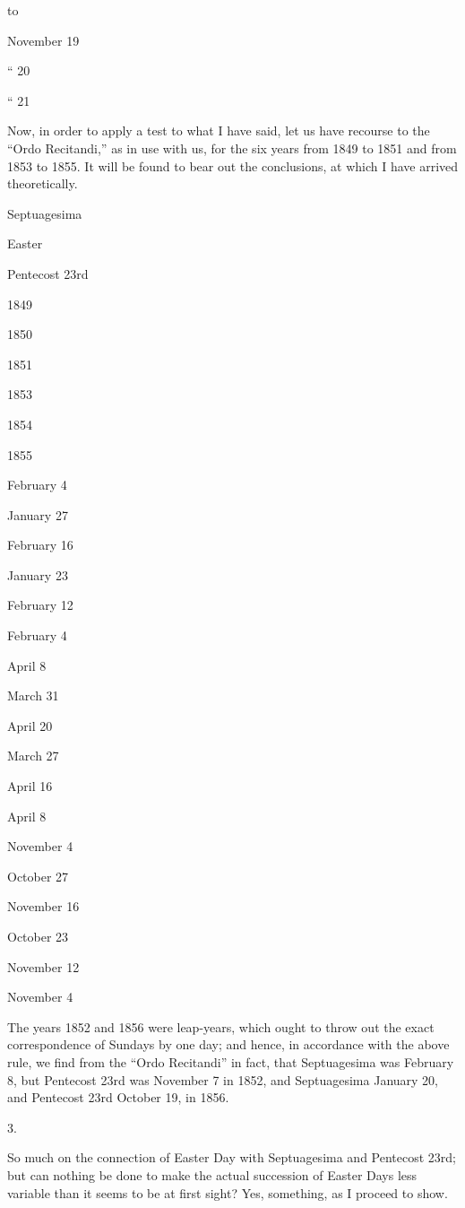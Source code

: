 to 

November 19

``
20

``
21

Now, in order to apply a
test to what I have said, let us have recourse to the ``Ordo
Recitandi,'' as in use with us, for the six years from 1849 to 1851 and from 1853 to
1855. It will be found to bear out the conclusions, at which I have
arrived theoretically.

Septuagesima

Easter

Pentecost
23rd

1849

1850

1851

1853

1854

1855

February 4

January 27

February 16

January 23

February 12

February 4

April 8

March 31

April 20

March 27

April 16

April 8

November 4

October
27

November 16

October
23

November 12

November 4

The years 1852 and 1856 were
leap-years, which ought to throw out the exact correspondence of
Sundays by one day; and hence, in accordance with the above rule, we
find from the ``Ordo Recitandi'' in fact, that Septuagesima was
February 8, but Pentecost 23rd was November 7 in 1852, and
Septuagesima January 20, and Pentecost 23rd October 19, in 1856.

3.

So much on the connection of
Easter Day with Septuagesima and Pentecost 23rd; but can nothing be
done to make the actual succession of Easter Days less variable than
it seems to be at first sight? Yes, something, as I proceed to show.

